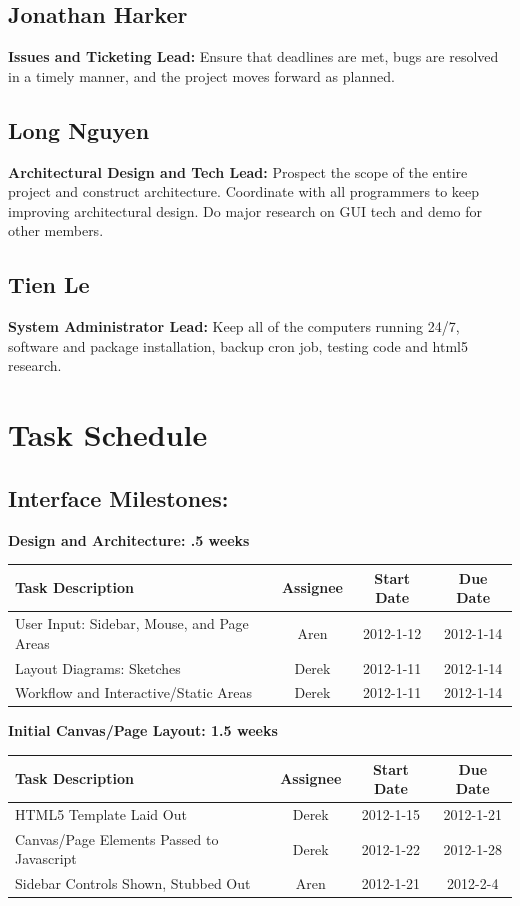 \documentclass[12pt, letterpaper]{article}
\begin{document}
  \subsection{Jonathan Harker}
  {\bf Issues and Ticketing Lead:} Ensure that deadlines are met, bugs are resolved in a timely manner, and the project moves forward as planned.
  \subsection{Long Nguyen}
  {\bf Architectural Design and Tech Lead:} Prospect the scope of the entire project and construct architecture. Coordinate with all programmers to keep improving architectural design. Do major research on GUI tech and demo for other members.
  \subsection{Tien Le}
  {\bf System Administrator Lead:} Keep all of the computers running 24/7, software and package installation, backup cron job, testing code and html5 research. 

\section{Task Schedule}
	\subsection{Interface Milestones:}

  \begin{center}
		{\bf Design and Architecture: .5 weeks}
    \begin{tabular}{| p{8.3cm} || c | c | c | }
      \hline
      Task Description & Assignee & Start Date & Due Date \\
      \hline
	    User Input: Sidebar, Mouse, and Page Areas & Aren & 2012-1-12 & 2012-1-14 \\
	    Layout Diagrams: Sketches & Derek & 2012-1-11 & 2012-1-14 \\
	    Workflow and Interactive/Static Areas & Derek & 2012-1-11 & 2012-1-14 \\
      \hline
    \end{tabular}
  \end{center}

  \begin{center}
		{\bf Initial Canvas/Page Layout: 1.5 weeks}
    \begin{tabular}{| p{8.3cm} || c | c | c | }
      \hline
      Task Description & Assignee & Start Date & Due Date \\
      \hline
	    HTML5 Template Laid Out & Derek & 2012-1-15 & 2012-1-21 \\
	    Canvas/Page Elements Passed to Javascript & Derek & 2012-1-22 & 2012-1-28 \\
	    Sidebar Controls Shown, Stubbed Out & Aren & 2012-1-21 & 2012-2-4 \\
      \hline
    \end{tabular}
  \end{center}
\end{document}
